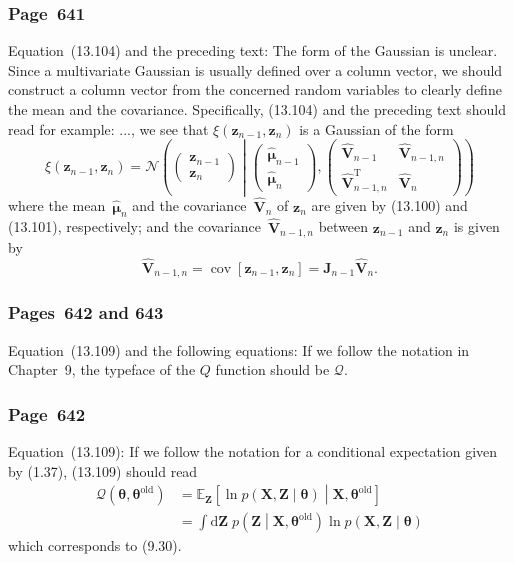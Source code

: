 \documentclass[12pt,a4paper]{article}
\newcommand{\erratum}[1]{\subsubsection*{#1}}
\begin{document}
\erratum{Page~641}
Equation~(13.104) and the preceding text:
The form of the Gaussian is unclear.
Since a multivariate Gaussian is usually defined over a column vector,
we should construct a column vector from the concerned random variables to clearly define the mean
and the covariance.
Specifically, (13.104) and the preceding text should read for example:
..., we see that $\xi(\mathbf{z}_{n-1}, \mathbf{z}_{n})$ is a Gaussian of the form
\begin{equation}
\xi(\mathbf{z}_{n-1}, \mathbf{z}_{n}) =
  \mathcal{N}\left(
    \begin{pmatrix}
      \mathbf{z}_{n-1} \\
      \mathbf{z}_{n}
    \end{pmatrix}
  \middle|
    \begin{pmatrix}
    \hat{\bm{\mu}}_{n-1} \\
    \hat{\bm{\mu}}_{n}
    \end{pmatrix},
    \begin{pmatrix}
      \hat{\mathbf{V}}_{n-1} & \hat{\mathbf{V}}_{n-1, n} \\
      \hat{\mathbf{V}}_{n-1, n}^{\operatorname{T}} & \hat{\mathbf{V}}_{n}
    \end{pmatrix}
  \right)
\end{equation}
where the mean~$\hat{\bm{\mu}}_{n}$ and the covariance~$\hat{\mathbf{V}}_{n}$ of
$\mathbf{z}_{n}$ are given by (13.100) and (13.101), respectively;
and the covariance~$\hat{\mathbf{V}}_{n-1, n}$ between $\mathbf{z}_{n-1}$ and $\mathbf{z}_{n}$
is given by
\begin{equation}
\hat{\mathbf{V}}_{n-1, n}
  = \operatorname{cov}\left[\mathbf{z}_{n-1}, \mathbf{z}_{n}\right]
  = \mathbf{J}_{n-1}\hat{\mathbf{V}}_{n} .
\end{equation}

\erratum{Pages~642 and 643}
Equation~(13.109) and the following equations:
If we follow the notation in Chapter~9, the typeface of the $Q$ function should be $\mathcal{Q}$.

\erratum{Page~642}
Equation~(13.109):
If we follow the notation for a conditional expectation given by (1.37),
(13.109) should read
\begin{align}
\mathcal{Q}\left(\bm{\theta}, \bm{\theta}^{\text{old}}\right)
  &= \mathbb{E}_{\mathbf{Z}} \left[
       \ln p \left( \mathbf{X}, \mathbf{Z} \middle| \bm{\theta} \right) \middle|
       \mathbf{X}, \bm{\theta}^{\text{old}} \right] \\
  &= \int \! \mathrm{d}\mathbf{Z} \;
       p \left( \mathbf{Z} \middle| \mathbf{X}, \bm{\theta}^{\text{old}}\right)
       \ln p \left( \mathbf{X}, \mathbf{Z} \middle| \bm{\theta} \right)
\end{align}
which corresponds to (9.30).
\end{document}
